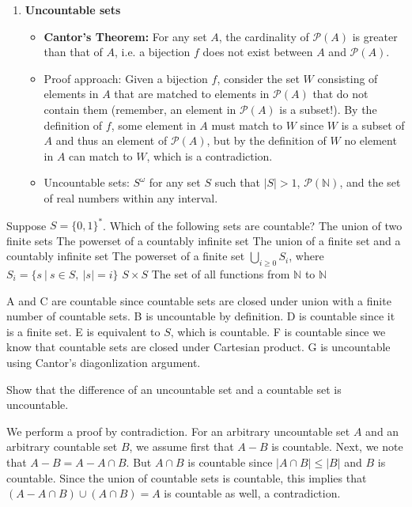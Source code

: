 \documentclass[solution, letterpaper]{cs20inclass}
\begin{document}
\begin{enumerate}
\item \textbf{Uncountable sets}
\begin{itemize}
\item {\bf Cantor's Theorem:} For any set $A$, the cardinality of $\mathcal{P}(A)$ is greater than that of $A$, i.e. a bijection $f$ does not exist between $A$ and $\mathcal{P}(A)$.
\item Proof approach: Given a bijection $f$, consider the set $W$ consisting of elements in $A$ that are matched to elements in $\mathcal{P}(A)$ that do not contain them (remember, an element in $\mathcal{P}(A)$ is a subset!). By the definition of $f$, some element in $A$ must match to $W$ since $W$ is a subset of $A$ and thus an element of $\mathcal{P}(A)$, but by the definition of $W$ no element in $A$ can match to $W$, which is a contradiction.
\item Uncountable sets: $S^\omega$ for any set $S$ such that $|S|>1$, $\mathcal{P}(\mathbb{N})$, and the set of real numbers within any interval.
\end{itemize}

\end{enumerate}
\pagebreak

\problem Suppose $S=\{0,1\}^*$. Which of the following sets are countable?
\subproblem The union of two finite sets
\subproblem The powerset of a countably infinite set
\subproblem The union of a finite set and a countably infinite set
\subproblem The powerset of a finite set
\subproblem $\bigcup_{i\geq 0} S_i$, where $S_i=\{s\ | \ s \in S, \ |s|=i\}$
\subproblem $S \times S$
\subproblem The set of all functions from $\mathbb{N}$ to $\mathbb{N}$


\begin{solution}
A and C are countable since countable sets are closed under union with a finite number of countable sets. B is uncountable by definition. D is countable since it is a finite set. E is equivalent to $S$, which is countable. F is countable since we know that countable sets are closed under Cartesian product. G is uncountable using Cantor's diagonlization argument.
\end{solution}

\problem Show that the difference of an uncountable set and a countable set is uncountable.

\begin{solution}
We perform a proof by contradiction. For an arbitrary uncountable set $A$ and an arbitrary
countable set $B$, we assume first that $A - B$ is countable. Next, we note that $A - B = A - A \cap B$. But $A \cap B$ is countable since $|A \cap B| \leq |B|$ and $B$ is countable. Since the union of countable sets is countable, this implies that $(A - A \cap B) \cup (A \cap B) = A$ is countable as well, a contradiction.
\end{solution}
\end{document}
